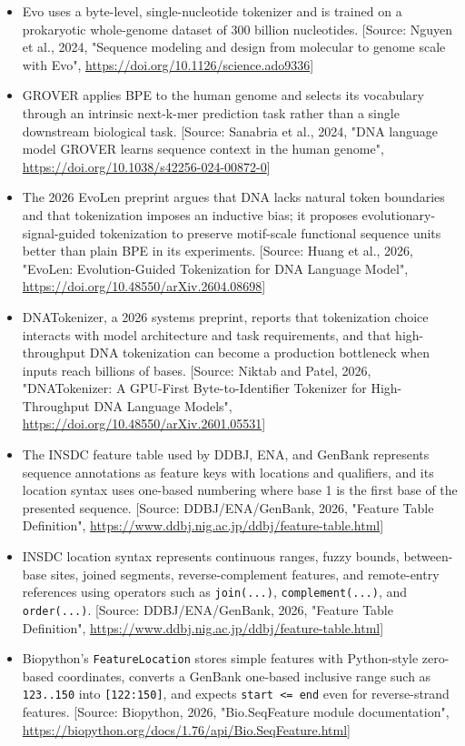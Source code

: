 \documentclass[11pt]{report}
\begin{document}
\begin{itemize}
\item Evo uses a byte-level, single-nucleotide tokenizer and is trained on a prokaryotic whole-genome dataset of 300 billion nucleotides. [Source: Nguyen et al., 2024, "Sequence modeling and design from molecular to genome scale with Evo", \url{https://doi.org/10.1126/science.ado9336}]
\item GROVER applies BPE to the human genome and selects its vocabulary through an intrinsic next-k-mer prediction task rather than a single downstream biological task. [Source: Sanabria et al., 2024, "DNA language model GROVER learns sequence context in the human genome", \url{https://doi.org/10.1038/s42256-024-00872-0}]
\item The 2026 EvoLen preprint argues that DNA lacks natural token boundaries and that tokenization imposes an inductive bias; it proposes evolutionary-signal-guided tokenization to preserve motif-scale functional sequence units better than plain BPE in its experiments. [Source: Huang et al., 2026, "EvoLen: Evolution-Guided Tokenization for DNA Language Model", \url{https://doi.org/10.48550/arXiv.2604.08698}]
\item DNATokenizer, a 2026 systems preprint, reports that tokenization choice interacts with model architecture and task requirements, and that high-throughput DNA tokenization can become a production bottleneck when inputs reach billions of bases. [Source: Niktab and Patel, 2026, "DNATokenizer: A GPU-First Byte-to-Identifier Tokenizer for High-Throughput DNA Language Models", \url{https://doi.org/10.48550/arXiv.2601.05531}]
\item The INSDC feature table used by DDBJ, ENA, and GenBank represents sequence annotations as feature keys with locations and qualifiers, and its location syntax uses one-based numbering where base 1 is the first base of the presented sequence. [Source: DDBJ/ENA/GenBank, 2026, "Feature Table Definition", \url{https://www.ddbj.nig.ac.jp/ddbj/feature-table.html}]
\item INSDC location syntax represents continuous ranges, fuzzy bounds, between-base sites, joined segments, reverse-complement features, and remote-entry references using operators such as \texttt{join(...)}, \texttt{complement(...)}, and \texttt{order(...)}. [Source: DDBJ/ENA/GenBank, 2026, "Feature Table Definition", \url{https://www.ddbj.nig.ac.jp/ddbj/feature-table.html}]
\item Biopython's \texttt{FeatureLocation} stores simple features with Python-style zero-based coordinates, converts a GenBank one-based inclusive range such as \texttt{123..150} into \texttt{[122:150]}, and expects \texttt{start <= end} even for reverse-strand features. [Source: Biopython, 2026, "Bio.SeqFeature module documentation", \url{https://biopython.org/docs/1.76/api/Bio.SeqFeature.html}]

\end{itemize}
\end{document}
